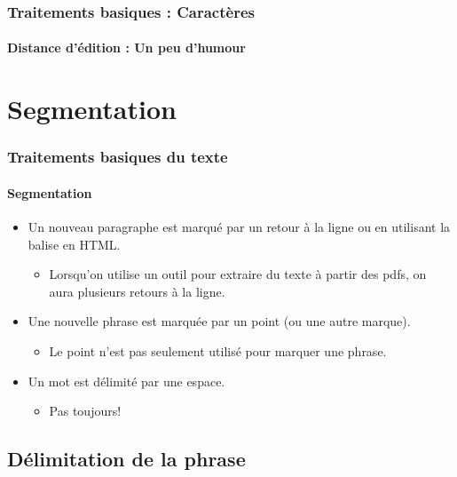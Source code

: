 \documentclass[xcolor=table]{beamer}
\begin{document}
\begin{frame}
\frametitle{Traitements basiques : Caractères}
\framesubtitle{Distance d'édition : Un peu d'humour}

\begin{center}
\end{center}

\end{frame}

\section{Segmentation}

\begin{frame}
\frametitle{Traitements basiques du texte}
\framesubtitle{Segmentation}

\begin{itemize}
	\item Un nouveau paragraphe est marqué par un retour à la ligne ou en utilisant la balise  en HTML.
	\begin{itemize}
		\item Lorsqu'on utilise un outil pour extraire du texte à partir des pdfs, on aura plusieurs retours à la ligne. 
	\end{itemize}
	\item Une nouvelle phrase est marquée par un point (ou une autre marque).
	\begin{itemize}
		\item Le point n'est pas seulement utilisé pour marquer une phrase.
	\end{itemize}
	\item Un mot est délimité par une espace.
	\begin{itemize}
		\item Pas toujours!
	\end{itemize}
\end{itemize}

\end{frame}

\subsection{Délimitation de la phrase}
\end{document}
